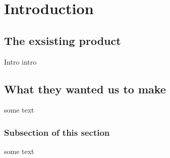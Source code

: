 
\chapter{Introduction} %

\label{Chapter1} %



\section{The exsisting product}
Intro intro


\section{What they wanted us to make}

some text
\subsection{Subsection of this section}
some text


